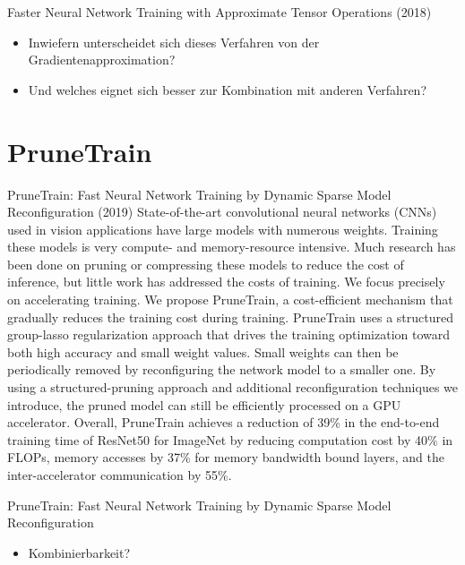 \documentclass[10pt]{beamer}
\begin{document}
\begin{frame}{Faster Neural Network Training with Approximate Tensor Operations (2018)}
 \begin{itemize}
  \item Inwiefern unterscheidet sich dieses Verfahren von der Gradientenapproximation?
  \item Und welches eignet sich besser zur Kombination mit anderen Verfahren?
 \end{itemize}

\end{frame}


\section{PruneTrain}

\begin{frame}{PruneTrain: Fast Neural Network Training by Dynamic Sparse Model Reconfiguration (2019)}
State-of-the-art convolutional neural networks (CNNs) used in vision applications have large models with numerous weights. Training these models is very compute- and memory-resource intensive.
Much research has been done on pruning or compressing these
models to reduce the cost of inference, but little work has addressed
the costs of training. We focus precisely on accelerating training.
We propose PruneTrain, a cost-efficient mechanism that gradually
reduces the training cost during training. PruneTrain uses a structured group-lasso regularization approach that drives the training optimization toward both high accuracy and small weight values. Small weights can then be periodically removed by reconfiguring the network model to a smaller one. By using a structured-pruning approach and additional reconfiguration techniques we introduce, the pruned model can still be efficiently processed on a GPU accelerator. Overall, PruneTrain achieves a reduction of 39\% in the end-to-end training time of ResNet50 for ImageNet by reducing computation cost by 40\% in FLOPs, memory accesses by 37\% for memory bandwidth bound layers, and the inter-accelerator communication by 55\%.
\end{frame}


\begin{frame}{PruneTrain: Fast Neural Network Training by Dynamic Sparse Model Reconfiguration}
 \begin{itemize}
  \item Kombinierbarkeit?
 \end{itemize}
\end{frame}
\end{document}
